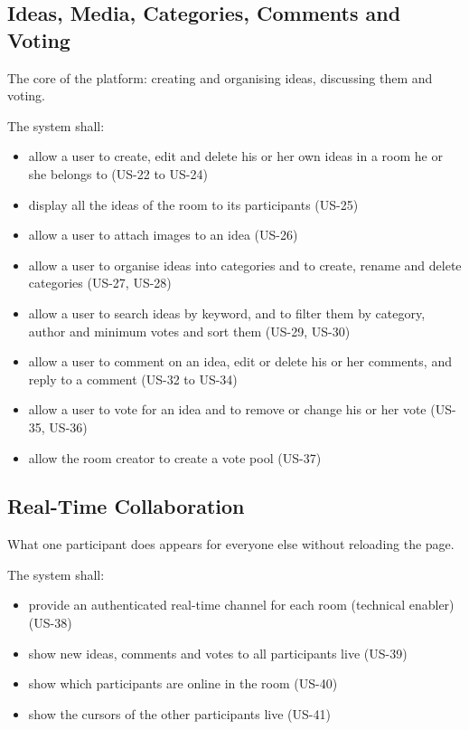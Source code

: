 \documentclass[12pt,a4paper]{report}
\begin{document}
\subsection{Ideas, Media, Categories, Comments and Voting}
\label{subsec:fr-ideas}

The core of the platform: creating and organising ideas, discussing them and voting.

\noindent The system shall:
\begin{itemize}
  \item allow a user to create, edit and delete his or her own ideas in a room he or she belongs to (US-22 to US-24)
  \item display all the ideas of the room to its participants (US-25)
  \item allow a user to attach images to an idea (US-26)
  \item allow a user to organise ideas into categories and to create, rename and delete categories (US-27, US-28)
  \item allow a user to search ideas by keyword, and to filter them by category, author and minimum votes and sort them (US-29, US-30)
  \item allow a user to comment on an idea, edit or delete his or her comments, and reply to a comment (US-32 to US-34)
  \item allow a user to vote for an idea and to remove or change his or her vote (US-35, US-36)
  \item allow the room creator to create a vote pool (US-37)
\end{itemize}

\subsection{Real-Time Collaboration}
\label{subsec:fr-realtime}

What one participant does appears for everyone else without reloading the page.

\noindent The system shall:
\begin{itemize}
  \item provide an authenticated real-time channel for each room (technical enabler) (US-38)
  \item show new ideas, comments and votes to all participants live (US-39)
  \item show which participants are online in the room (US-40)
  \item show the cursors of the other participants live (US-41)
\end{itemize}
\end{document}
